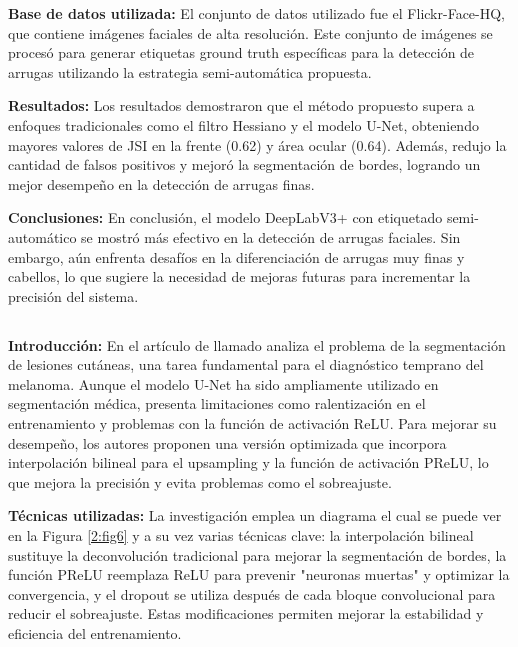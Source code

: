 \textbf{Base de datos utilizada:}
El conjunto de datos utilizado fue el Flickr-Face-HQ, que contiene imágenes faciales de alta resolución. Este conjunto de imágenes se procesó para generar etiquetas ground truth específicas para la detección de arrugas utilizando la estrategia semi-automática propuesta.

\textbf{Resultados:}
Los resultados demostraron que el método propuesto supera a enfoques tradicionales como el filtro Hessiano y el modelo U-Net, obteniendo mayores valores de JSI en la frente (0.62) y área ocular (0.64). Además, redujo la cantidad de falsos positivos y mejoró la segmentación de bordes, logrando un mejor desempeño en la detección de arrugas finas.

\textbf{Conclusiones:}
En conclusión, el modelo DeepLabV3+ con etiquetado semi-automático se mostró más efectivo en la detección de arrugas faciales. Sin embargo, aún enfrenta desafíos en la diferenciación de arrugas muy finas y cabellos, lo que sugiere la necesidad de mejoras futuras para incrementar la precisión del sistema.


\subsection{}

\textbf{Introducción:}
En el artículo de \cite{karshiev2020improved} llamado  analiza el problema de la segmentación de lesiones cutáneas, una tarea fundamental para el diagnóstico temprano del melanoma. Aunque el modelo U-Net ha sido ampliamente utilizado en segmentación médica, presenta limitaciones como ralentización en el entrenamiento y problemas con la función de activación ReLU. Para mejorar su desempeño, los autores proponen una versión optimizada que incorpora interpolación bilineal para el upsampling y la función de activación PReLU, lo que mejora la precisión y evita problemas como el sobreajuste.

\textbf{Técnicas utilizadas:}
La investigación emplea un diagrama el cual se puede ver en la Figura \ref{2:fig6} y a su vez varias técnicas clave: la interpolación bilineal sustituye la deconvolución tradicional para mejorar la segmentación de bordes, la función PReLU reemplaza ReLU para prevenir "neuronas muertas" y optimizar la convergencia, y el dropout se utiliza después de cada bloque convolucional para reducir el sobreajuste. Estas modificaciones permiten mejorar la estabilidad y eficiencia del entrenamiento.

